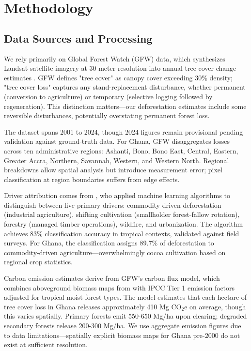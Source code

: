 \section{Methodology}

\subsection{Data Sources and Processing}

We rely primarily on Global Forest Watch (GFW) data, which synthesizes Landsat satellite imagery at 30-meter resolution into annual tree cover change estimates \citep{hansen2013high}. GFW defines "tree cover" as canopy cover exceeding 30\% density; "tree cover loss" captures any stand-replacement disturbance, whether permanent (conversion to agriculture) or temporary (selective logging followed by regeneration). This distinction matters—our deforestation estimates include some reversible disturbances, potentially overstating permanent forest loss.

The dataset spans 2001 to 2024, though 2024 figures remain provisional pending validation against ground-truth data. For Ghana, GFW disaggregates losses across ten administrative regions: Ashanti, Bono, Bono East, Central, Eastern, Greater Accra, Northern, Savannah, Western, and Western North. Regional breakdowns allow spatial analysis but introduce measurement error; pixel classification at region boundaries suffers from edge effects.

Driver attribution comes from \citet{curtis2018classifying}, who applied machine learning algorithms to distinguish between five primary drivers: commodity-driven deforestation (industrial agriculture), shifting cultivation (smallholder forest-fallow rotation), forestry (managed timber operations), wildfire, and urbanization. The algorithm achieves 83\% classification accuracy in tropical contexts, validated against field surveys. For Ghana, the classification assigns 89.7\% of deforestation to commodity-driven agriculture—overwhelmingly cocoa cultivation based on regional crop statistics.

Carbon emission estimates derive from GFW's carbon flux model, which combines aboveground biomass maps from \citet{baccini2012estimated} with IPCC Tier 1 emission factors adjusted for tropical moist forest types. The model estimates that each hectare of tree cover loss in Ghana releases approximately 410 Mg CO$_2$e on average, though this varies spatially. Primary forests emit 550-650 Mg/ha upon clearing; degraded secondary forests release 200-300 Mg/ha. We use aggregate emission figures due to data limitations—spatially explicit biomass maps for Ghana pre-2000 do not exist at sufficient resolution.

